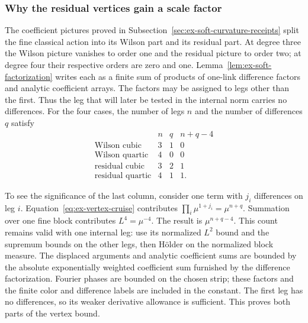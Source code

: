 \subsubsection{Why the residual vertices gain a scale factor}
The coefficient pictures proved in
Subsection~\ref{sec:ex-soft-curvature-receipts} split the fine classical
action into its Wilson part and its residual part. At degree three the
Wilson picture vanishes to order one and the residual picture to order
two; at degree four their respective orders are zero and one.
Lemma~\ref{lem:ex-soft-factorization} writes each as a finite sum of
products of one-link difference factors and analytic coefficient arrays.
The factors may be assigned to legs other than the first. Thus the leg
that will later be tested in the internal norm carries no differences.
For the four cases, the number of legs $n$ and the number of differences
$q$ satisfy
\[
\begin{array}{c|cc|c}
 &n&q&n+q-4\\ \hline
\text{Wilson cubic}&3&1&0\\
\text{Wilson quartic}&4&0&0\\
\text{residual cubic}&3&2&1\\
\text{residual quartic}&4&1&1.
\end{array}
\]

To see the significance of the last column, consider one term with
$j_i$ differences on leg $i$. Equation~\eqref{eq:ex-vertex-cruise}
contributes $\prod_i\mu^{1+j_i}=\mu^{n+q}$. Summation over one fine
block contributes $L^4=\mu^{-4}$. The result is
$\mu^{n+q-4}$. This count remains valid with one internal leg: use its
normalized $L^2$ bound and the supremum bounds on the other legs, then
H\"older on the normalized block measure. The displaced arguments and
analytic coefficient sums are bounded by the absolute exponentially
weighted coefficient sum furnished by the difference factorization.
Fourier phases are bounded on the chosen strip; these factors and the
finite color and difference labels are included in the constant. The
first leg has no differences, so its weaker derivative allowance is
sufficient. This proves both parts of the vertex bound.

